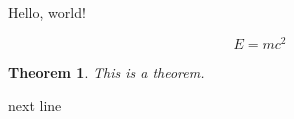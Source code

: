 \documentclass{article}
\newtheorem{theorem}{Theorem}
\begin{document}
Hello, world!

\[
E = mc^2
\]

\begin{theorem}
This is a theorem.
\end{theorem}

next line
\end{document}
